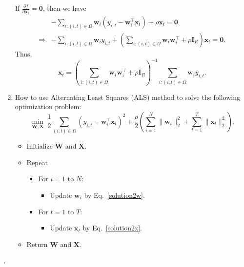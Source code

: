 \documentclass[12pt]{article}
\begin{document}
\begin{enumerate}
{If $\frac{\partial f}{\partial \boldsymbol{x}_{t}}=\boldsymbol{0}$, then we have
\begin{equation}
\begin{aligned}
&-\sum_{i:(i,t)\in\Omega}\boldsymbol{w}_{i}\left(y_{i,t}-\boldsymbol{w}_{i}^{\top}\boldsymbol{x}_{t}\right)+\rho\boldsymbol{x}_{t}=\boldsymbol{0} \\
\Longrightarrow&-\sum_{i:(i,t)\in\Omega}\boldsymbol{w}_{i}y_{i,t}+\left(\sum_{i:(i,t)\in\Omega}\boldsymbol{w}_{i}\boldsymbol{w}_{i}^{\top}+\rho\boldsymbol{I}_{R}\right)\boldsymbol{x}_{t}=\boldsymbol{0}.
\end{aligned}
\end{equation}
Thus,
\begin{equation}\label{solution2x}
\boldsymbol{x}_{t}=\left(\sum_{i:(i,t)\in\Omega}\boldsymbol{w}_{i}\boldsymbol{w}_{i}^{\top}+\rho\boldsymbol{I}_{R}\right)^{-1}\sum_{i:(i,t)\in\Omega}\boldsymbol{w}_{i}y_{i,t}.
\end{equation}
}

\item How to use Alternating Least Squares (ALS) method to solve the following optimization problem:
\begin{equation}
\min_{\boldsymbol{W},\boldsymbol{X}}~\frac{1}{2}\sum_{(i,t)\in\Omega}\left(y_{i,t}-\boldsymbol{w}_{i}^{\top}\boldsymbol{x}_{t}\right)^{2}+\frac{\rho}{2}\left(\sum_{i=1}^{N}\|\boldsymbol{w}_{i}\|_{2}^{2}+\sum_{t=1}^{T}\|\boldsymbol{x}_{t}\|_{2}^{2}\right).
\end{equation}

{\color{red}
\begin{itemize}
\item Initialize $\boldsymbol{W}$ and $\boldsymbol{X}$.
\item Repeat
\begin{itemize}
\item[\textbullet] For $i=1$ to $N$:
\begin{itemize}
\item[\textbullet] Update $\boldsymbol{w}_{i}$ by Eq.~\eqref{solution2w}.
\end{itemize}
\item[\textbullet] For $t=1$ to $T$:
\begin{itemize}
\item[\textbullet] Update $\boldsymbol{x}_{t}$ by Eq.~\eqref{solution2x}.
\end{itemize}
\end{itemize}
\item Return $\boldsymbol{W}$ and $\boldsymbol{X}$.
\end{itemize}
}

\end{enumerate}

\bigskip

\noindent\emph{.}
\end{document}
